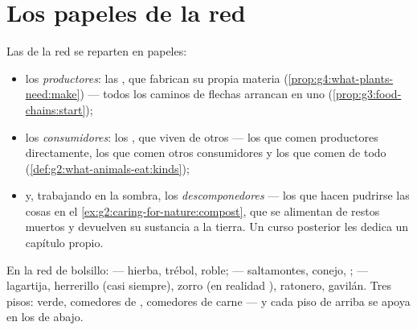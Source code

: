 \section{Los papeles de la red}

\begin{definition}\label{def:g5:food-webs:roles}
Las  de la red se reparten en papeles:
\begin{itemize}
  \item los \emph{productores}: las , que
        fabrican su propia materia
        (\cref{prop:g4:what-plants-need:make}) --- todos los caminos
        de flechas arrancan en uno
        (\cref{prop:g3:food-chains:start});
  \item los \emph{consumidores}: los , que
        viven de otros --- los  que comen productores
        directamente, los  que comen otros consumidores y
        los  que comen de todo
        (\cref{def:g2:what-animals-eat:kinds});
  \item y, trabajando en la sombra, los
        \emph{descomponedores} --- los que hacen
        pudrirse las cosas en el \cref{ex:g2:caring-for-nature:compost},
        que se alimentan de restos muertos y devuelven su sustancia a
        la tierra. Un curso posterior les dedica un capítulo propio.
\end{itemize}
\end{definition}

\begin{example}\label{ex:g5:food-webs:sorting}
En la red de bolsillo:  --- hierba, trébol, roble;
  --- saltamontes, conejo, ; 
 --- lagartija, herrerillo (casi siempre), zorro (en
realidad ), ratonero, gavilán. Tres pisos: verde, comedores de
, comedores de carne --- y cada piso de arriba se apoya en los
de abajo.
\end{example}

